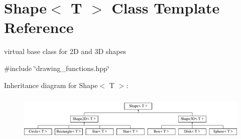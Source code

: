 \hypertarget{classShape}{}\section{Shape$<$ T $>$ Class Template Reference}
\label{classShape}


virtual base class for 2D and 3D shapes  




{\ttfamily \#include \char`\"{}drawing\+\_\+functions.\+hpp\char`\"{}}

Inheritance diagram for Shape$<$ T $>$\+:\begin{figure}[H]
\begin{center}
\leavevmode
\includegraphics[height=2.242991cm]{classShape}
\end{center}
\end{figure}
